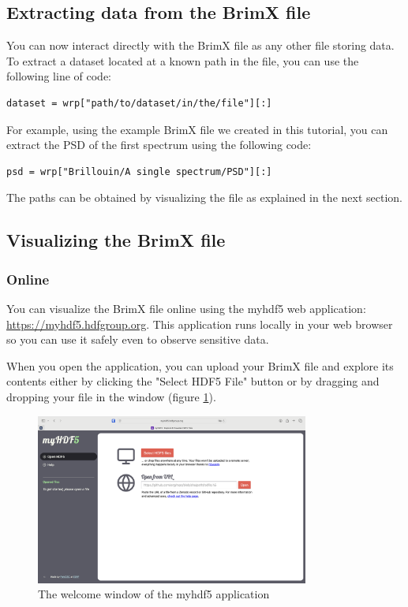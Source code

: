 \documentclass{article}
\begin{document}
\subsection{Extracting data from the BrimX file}

You can now interact directly with the BrimX file as any other file storing data. To extract a dataset located at a known path in the file, you can use the following line of code:
\begin{lstlisting}
dataset = wrp["path/to/dataset/in/the/file"][:]
\end{lstlisting}

For example, using the example BrimX file we created in this tutorial, you can extract the PSD of the first spectrum using the following code:
\begin{lstlisting}
psd = wrp["Brillouin/A single spectrum/PSD"][:]
\end{lstlisting}

The paths can be obtained by visualizing the file as explained in the next section.

\subsection{Visualizing the BrimX file}

\subsubsection{Online}

You can visualize the BrimX file online using the myhdf5 web application: \url{https://myhdf5.hdfgroup.org}. This application runs locally in your web browser so you can use it safely even to observe sensitive data.

When you open the application, you can upload your BrimX file and explore its contents either by clicking the "Select HDF5 File" button or by dragging and dropping your file in the window (figure \ref{fig:my_hdf5_welcome}). 

\begin{figure}[H]
    \centering
    \includegraphics[width=0.8\textwidth]{img/MyHDF5_welcome_window.png}
    \caption{The welcome window of the myhdf5 application}
    \label{fig:my_hdf5_welcome}
\end{figure}
\end{document}
